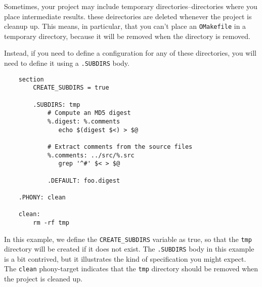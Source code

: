 Sometimes, your project may include temporary directories--directories where you place intermediate
results.  these deirectories are deleted whenever the project is cleanup up.  This means, in
particular, that you can't place an \verb+OMakefile+ in a temporary directory, because it will be
removed when the directory is removed.

Instead, if you need to define a configuration for any of these directories, you will need to define
it using a \verb+.SUBDIRS+ body.

\begin{verbatim}
    section
        CREATE_SUBDIRS = true

        .SUBDIRS: tmp
            # Compute an MD5 digest
            %.digest: %.comments
               echo $(digest $<) > $@

            # Extract comments from the source files
            %.comments: ../src/%.src
               grep '^#' $< > $@

            .DEFAULT: foo.digest

    .PHONY: clean

    clean:
        rm -rf tmp        
\end{verbatim}

In this example, we define the \verb+CREATE_SUBDIRS+ variable as true, so that the \verb+tmp+
directory will be created if it does not exist.  The \verb+.SUBDIRS+ body in this example is a bit
contrived, but it illustrates the kind of specification you might expect.  The \verb+clean+
phony-target indicates that the \verb+tmp+ directory should be removed when the project is cleaned
up.


